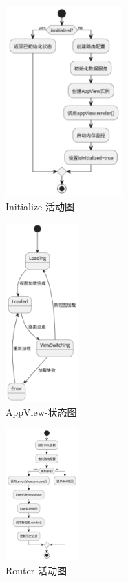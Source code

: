 \documentclass{base}
\numberwithin{figure}{section} %
\begin{document}
\begin{figure}[H]
    \centering
    \includegraphics[width=0.4\textwidth]{images/5-8.png}
    \caption{Initialize-活动图}
\end{figure}
\begin{figure}[H]
    \centering
    \includegraphics[width=0.25\textwidth]{images/5-9.png}
    \caption{AppView-状态图}
\end{figure}
\begin{figure}[H]
    \centering
    \includegraphics[width=0.25\textwidth]{images/5-10.png}
    \caption{Router-活动图}
\end{figure}
\end{document}
